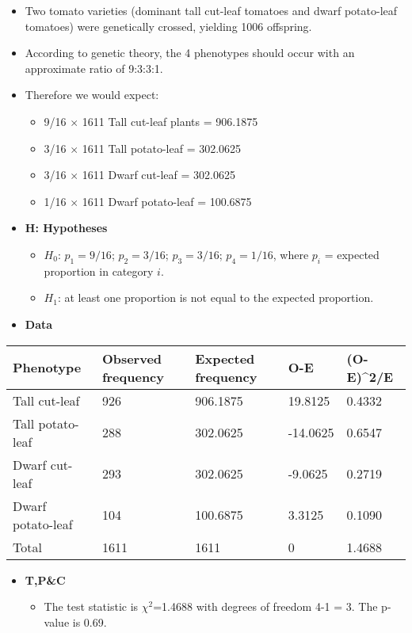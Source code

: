 \documentclass[]{article}
\providecommand{\tightlist}{%
  \setlength{\itemsep}{0pt}\setlength{\parskip}{0pt}}
\begin{document}
\begin{itemize}
\item
  Two tomato varieties (dominant tall cut-leaf tomatoes and dwarf potato-leaf tomatoes) were genetically crossed, yielding 1006 offspring.
\item
  According to genetic theory, the 4 phenotypes should occur with an approximate ratio of 9:3:3:1.
\item
  Therefore we would expect:

  \begin{itemize}
  \tightlist
  \item
    9/16 \(\times\) 1611 Tall cut-leaf plants = 906.1875
  \item
    3/16 \(\times\) 1611 Tall potato-leaf = 302.0625
  \item
    3/16 \(\times\) 1611 Dwarf cut-leaf = 302.0625
  \item
    1/16 \(\times\) 1611 Dwarf potato-leaf = 100.6875
  \end{itemize}
\item
  \textbf{H: Hypotheses}

  \begin{itemize}
  \tightlist
  \item
    \(H_0\): \(p_1=9/16\); \(p_2=3/16\); \(p_3=3/16\); \(p_4=1/16\), where \(p_{i}\) = expected proportion in category \(i\).
  \item
    \(H_1\): at least one proportion is not equal to the expected proportion.
  \end{itemize}
\item
  \textbf{Data}
\end{itemize}

\begin{longtable}[]{@{}lllll@{}}
\toprule
Phenotype & Observed frequency & Expected frequency & O-E & (O-E)\^{}2/E\tabularnewline
\midrule
\endhead
Tall cut-leaf & 926 & 906.1875 & 19.8125 & 0.4332\tabularnewline
Tall potato-leaf & 288 & 302.0625 & -14.0625 & 0.6547\tabularnewline
Dwarf cut-leaf & 293 & 302.0625 & -9.0625 & 0.2719\tabularnewline
Dwarf potato-leaf & 104 & 100.6875 & 3.3125 & 0.1090\tabularnewline
Total & 1611 & 1611 & 0 & 1.4688\tabularnewline
\bottomrule
\end{longtable}

\begin{itemize}
\item
  \textbf{T,P\&C}

  \begin{itemize}
  \tightlist
  \item
    The test statistic is \(\chi^2\)=1.4688 with degrees of freedom 4-1 = 3. The p-value is 0.69.
  \end{itemize}
\end{itemize}
\end{document}
